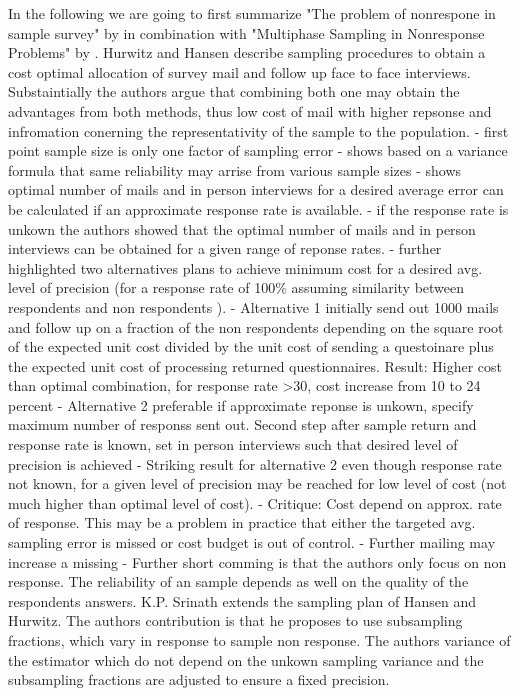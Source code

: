 In the following we are going to first summarize "The problem of nonrespone in sample survey" by \cite{Hurwitz}in combination with "Multiphase Sampling in Nonresponse Problems" by \cite{Srinath}. 
Hurwitz and Hansen describe sampling procedures to obtain a cost optimal allocation of survey mail and follow up face to face interviews. Substaintially the authors argue that combining both one may obtain the advantages from both methods, thus low cost of mail with higher repsonse and infromation conerning the representativity of the sample to the population. 
- first point sample size is only one factor of sampling error
- shows based on a variance formula that same reliability may arrise from various sample sizes
- shows optimal number of mails and in person interviews for a desired average error can be calculated if an approximate response rate is available.
- if the response rate is unkown the authors showed that the optimal number of mails and in person interviews can be obtained for a given range of reponse rates.
-  further highlighted two alternatives plans to achieve minimum cost for a desired avg. level of precision (for a response rate of 100\% assuming similarity between respondents and non respondents ).
- Alternative 1 initially send out 1000 mails and follow up on a fraction of the non respondents depending on the square root of the expected unit cost divided by the unit cost of sending a questoinare plus the expected unit cost of processing returned questionnaires.
  Result: Higher cost than optimal combination, for response rate >30, cost increase from 10 to 24 percent
- Alternative 2 preferable if approximate reponse is unkown, specify maximum number of responss sent out. Second step after sample return and response rate is known, set in person interviews such that desired level of precision is achieved
- Striking result for alternative 2 even though response rate not known, for a given level of precision may be reached for low level of cost (not much higher than optimal level of cost). 
- Critique: Cost depend on approx. rate of response. This may be a problem in practice that either the targeted avg. sampling error is missed or cost budget is out of control. 
- Further mailing may increase a missing
- Further short comming is that the authors only focus on non response. The reliability of an sample depends as well on the quality of the respondents answers. 
K.P. Srinath extends the sampling plan of Hansen and Hurwitz. The authors contribution is that he proposes to use subsampling fractions, which vary in response to sample non response. The authors variance of the estimator which do not depend on the unkown sampling variance and the subsampling fractions are adjusted to ensure a fixed precision.  

\endinput
